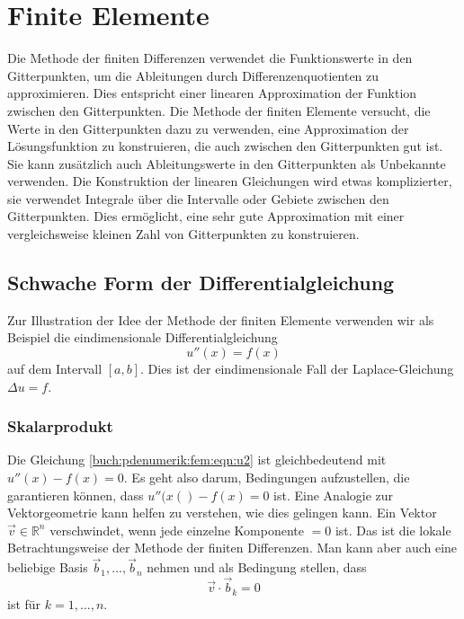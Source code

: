 %
%
\section{Finite Elemente
\label{buch:pdenumerik:section:fem}}
Die Methode der finiten Differenzen verwendet die Funktionswerte
in den Gitterpunkten, um die Ableitungen durch Differenzenquotienten
zu approximieren.
Dies entspricht einer linearen Approximation der Funktion zwischen
den Gitterpunkten.
Die Methode der finiten Elemente versucht, die Werte in den
Gitterpunkten dazu zu verwenden, eine Approximation der Lösungsfunktion
zu konstruieren, die auch zwischen den Gitterpunkten gut ist.
Sie kann zusätzlich auch Ableitungswerte in den Gitterpunkten als
Unbekannte verwenden.
Die Konstruktion der linearen Gleichungen wird etwas komplizierter,
sie verwendet Integrale über die Intervalle oder Gebiete zwischen
den Gitterpunkten.
Dies ermöglicht, eine sehr gute Approximation mit einer vergleichsweise
kleinen Zahl von Gitterpunkten zu konstruieren.

%
%
\subsection{Schwache Form der Differentialgleichung}
Zur Illustration der Idee der Methode der finiten Elemente verwenden wir
als Beispiel die eindimensionale Differentialgleichung
\begin{equation}
u''(x) = f(x)
\label{buch:pdenumerik:fem:eqn:u2}
\end{equation}
auf dem Intervall $[a,b]$.
Dies ist der eindimensionale Fall der Laplace-Gleichung $\Delta u = f$.

%
%
\subsubsection{Skalarprodukt}
Die Gleichung \eqref{buch:pdenumerik:fem:eqn:u2} ist gleichbedeutend
mit $u''(x)-f(x)=0$.
Es geht also darum, Bedingungen aufzustellen, die garantieren können,
dass $u''(x()-f(x)=0$ ist.
Eine Analogie zur Vektorgeometrie kann helfen zu verstehen, wie dies 
gelingen kann.
Ein Vektor $\vec{v}\in\mathbb{R}^n$ verschwindet, wenn jede einzelne
Komponente $=0$ ist.
Das ist die lokale Betrachtungsweise der Methode der finiten Differenzen.
Man kann aber auch eine beliebige Basis $\vec{b}_1,\dots,\vec{b}_n$ nehmen
und als Bedingung stellen, dass 
\[
\vec{v}\cdot\vec{b}_k = 0
\]
ist für $k=1,\dots,n$.


